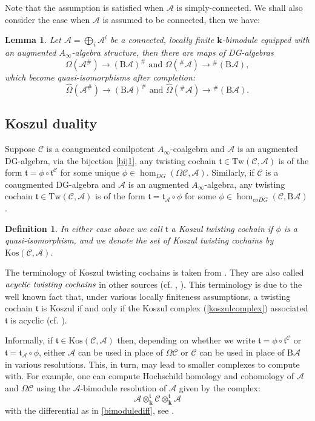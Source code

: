 \documentclass{gtpart}
\newtheorem{lem}[thm]{Lemma}
\newtheorem{defi}[thm]{Definition}
\renewcommand{\k}{\mathbf{k}}
\renewcommand{\t}{\mathfrak{t}}
\newcommand{\A}{\mathscr{A}}
\renewcommand{\Bar}{\mathrm{B}}
\renewcommand{\C}{\mathscr{C}}
\begin{document}
Note that the assumption is satisfied when $\A$ is simply-connected. We shall also consider the
case when $\A$ is assumed to be connected, then we have:
\begin{lem} \label{dualbar0} Let $\A = \bigoplus_{i} \A^{i}$ be a connected, locally finite
    $\k$-bimodule equipped with an augmented $A_\infty$-algebra structure, then there are maps of
    DG-algebras
    \[ \Omega(\A^\#) \to (\Bar \A)^\# \text{\ \ \ and \ \ \ }\Omega(^\#\!\A) \to \!^\#(\Bar \A),
    \]  
which become quasi-isomorphisms  after completion:
    \[ \widehat{\Omega}(\A^\#) \to (\Bar \A)^\# \text{\ \ \ and \ \ \ } \widehat{\Omega}(^\#\!\A) \to \!^\#(\Bar \A).  \] 
\end{lem}

\subsection{Koszul duality} 
    \label{algkoszul} 

Suppose $\C$ is a coaugmented conilpotent $A_\infty$-coalgebra and $\A$ is an augmented DG-algebra, via the bijection \eqref{bij1}, any twisting cochain $\t \in \mathrm{Tw}(\C,\A)$ is of the form $\t = \phi \circ
    \t^\C$ for some unique $\phi \in \hom_{DG}(\Omega\C,\A)$. 
    Similarly, if $\C$ is a coaugmented DG-algebra and $\A$ is an augmented $A_\infty$-algebra, any twisting cochain $\t \in \mathrm{Tw}(\C,\A)$ is of the form $\t = \t_\A \circ \phi$
    for some $\phi \in \hom_{coDG}(\C, \Bar \A)$. 

\begin{defi}\label{ktc}    
In either case above we call $\t$ a \emph{Koszul twisting cochain} if $\phi$ is a quasi-isomorphism, and we denote the set of Koszul twisting cochains by $\mathrm{Kos}(\C,\A)$. 
\end{defi}

The terminology of Koszul twisting cochains is taken from \cite{LV}. They are also called $\emph{acyclic twisting cochains}$ in other sources (cf. \cite{L-H}, \cite{Posit}). This terminology is due to the well known fact that, under various locally finiteness assumptions, a twisting cochain $\t$ is Koszul if and only if the Koszul complex (\ref{koszulcomplex}) associated $\t$ is acyclic (cf. \cite[Appendix A]{Posit}).

Informally, if $\t \in \mathrm{Kos}(\C, \A)$ then, depending on whether we write
    $\t=\phi\circ\t^{\C}$ or $\t=\t_{\A}\circ\phi$, either $\A$ can be used in place of $\Omega \C$
    or $\C$ can be used in place of $\Bar \A$
in various resolutions. This, in turn, may lead to smaller complexes to compute with. For example,
    one can compute Hochschild homology and cohomology of $\A$ and $\Omega \C$ using the
    $\A$-bimodule resolution of $\A$ given by the complex:
    \[ \A \otimes_{\k}^{\t} \C \otimes_{\k}^{\t} \A \] 
    with the differential as in \eqref{bimodulediff}, see \cite{herscovich}.
\end{document}
